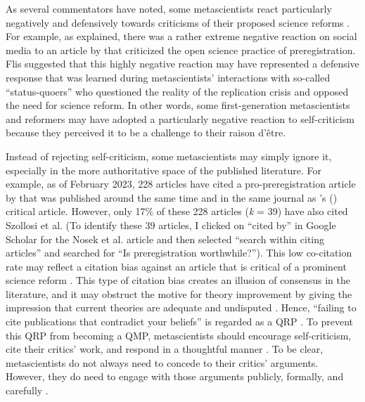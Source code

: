 \documentclass[authordate, meta]{jote-new-article}
\begin{document}
As several commentators have noted, some metascientists react particularly negatively and defensively towards criticisms of their proposed science reforms \parencites{Bastian2021}{Gervais2021}[p. 5]{Malich2022}[p. 132]{Walkup2021}. For example, as \textcite{Flis2022} explained, there was a rather extreme negative reaction on social media to an article by \textcite{Szollosi2020} that criticized the open science practice of preregistration. Flis suggested that this highly negative reaction may have represented a defensive response that was learned during metascientists’ interactions with so-called “status-quoers” who questioned the reality of the replication crisis and opposed the need for science reform. In other words, some first-generation metascientists and reformers may have adopted a particularly negative reaction to self-criticism because they perceived it to be a challenge to their raison d’être.



Instead of rejecting self-criticism, some metascientists may simply ignore it, especially in the more authoritative space of the published literature. For example, as of February 2023, 228 articles have cited a pro-preregistration article by \textcite{Nosek2019} that was published around the same time and in the same journal as \citeauthor{Szollosi2020}'s \mbox{(\hspace*{-.21em}\citeyear{Szollosi2020})} critical article. However, only 17\% of these 228 articles (\emph{k }= 39) have also cited Szollosi et al. (To identify these 39 articles, I clicked on “cited by” in Google Scholar for the Nosek et al. article and then selected “search within citing articles” and searched for “Is preregistration worthwhile?”). This low co-citation rate may reflect a citation bias against an article that is critical of a prominent science reform \parencites[for another example of potential citation bias, please see][p. 6]{Flis2022}. This type of citation bias creates an illusion of consensus in the literature, and it may obstruct the motive for theory improvement by giving the impression that current theories are adequate and undisputed \parencites[see also][]{Bishop2020}[p. 1604]{Hoekstra2021}. Hence, “failing to cite publications that contradict your beliefs” is regarded as a QRP \parencites[p. 8]{Allum2023}. To prevent this QRP from becoming a QMP, metascientists should encourage self-criticism, cite their critics’ work, and respond in a thoughtful manner \parencites{Altenmüller2021}[p. 828]{Gervais2021}[p. 235]{Haig2022}[p. 1604]{Hoekstra2021}. To be clear, metascientists do not always need to concede to their critics’ arguments. However, they do need to engage with those arguments publicly, formally, and carefully \parencites[see also][]{Longino1990}.
\end{document}
